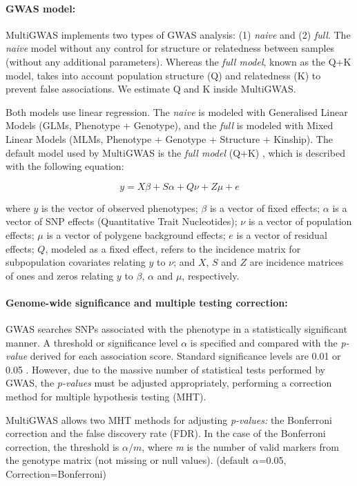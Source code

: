 \documentclass{article}
\begin{document}
\paragraph{GWAS model:}
MultiGWAS implements two types of GWAS analysis: (1) \textit{naive} and (2) \textit{full}. The \textit{naive} model without any control for structure or relatedness between samples (without any additional parameters). Whereas the \textit{full model}, known as the Q+K model, takes into account population structure (Q) and relatedness (K) to prevent false associations. We estimate Q and K inside MultiGWAS. 

Both models use linear regression. The \emph{naive} is modeled with Generalised Linear Models (GLMs, Phenotype + Genotype), and the \emph{full} is modeled with Mixed Linear Models (MLMs, Phenotype + Genotype + Structure + Kinship). The default model used by MultiGWAS is the \emph{full model} (Q+K) \cite{Yu2006}, which is described with the following equation:

\[
y=X\beta+S\alpha+Q\nu+Z\mu+e
\]

where $y$ is the vector of observed phenotypes; $\beta$ is a vector of fixed effects; $\alpha$ is a vector of SNP effects (Quantitative Trait Nucleotides); $\nu$ is a vector of population effects; $\mu$ is a vector of polygene background effects; $e$ is a vector of residual effects; $Q$, modeled as a fixed effect, refers to the incidence matrix for subpopulation covariates relating $y$ to $\nu$; and $X$, $S$ and $Z$ are incidence matrices of ones and zeros relating $y$ to $\beta$, $\alpha$ and $\mu$, respectively.



\paragraph{Genome-wide significance and multiple testing correction:}
GWAS searches SNPs associated with the phenotype in a statistically significant manner. A threshold or significance level $\alpha$ is specified and compared with the \emph{p-value} derived for each association score. Standard significance levels are 0.01 or 0.05 \cite{Gumpinger2018,Rosyara2016}.  However, due to the massive number of statistical tests performed by GWAS, the \emph{p-values }must be adjusted appropriately, performing a correction method for multiple hypothesis testing (MHT). 

MultiGWAS allows two MHT methods for adjusting \emph{p-values:} the Bonferroni correction and the false discovery rate (FDR). In the case of the Bonferroni correction, the threshold is $\alpha/m$, where \emph{m }is the number of valid markers from the genotype matrix (not missing or null values). (default $\alpha$=0.05, Correction=Bonferroni)
\end{document}
